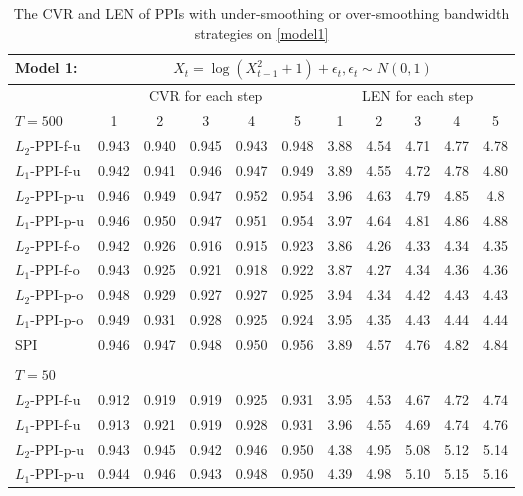 \documentclass[a4paper]{article}
\begin{document}
\begin{table}[htbp]
\centering
  \caption{The CVR and LEN of PPIs with under-smoothing or over-smoothing bandwidth strategies on \cref{model1}}
  \vspace{2pt}
  \label{Tab:model1PPIcompare}
\begin{tabular}{lcccccccccc}
  \toprule 
 Model 1: & \multicolumn{10}{c}{$X_t = \log(X_{t-1}^2 + 1) + \epsilon_t, \epsilon_t\sim N(0,1)$} \\
 \midrule
  & \multicolumn{5}{c}{CVR for each step} & \multicolumn{5}{c}{LEN for each step}\\
    $T = 500$ & 1     & 2     & 3     & 4     & 5 & 1 & 2 & 3 & 4 & 5  \\[3pt]
$L_2$-PPI-f-u & 0.943 & 0.940 & 0.945 & 0.943 & 0.948 & 3.88 & 4.54 & 4.71 & 4.77 & 4.78 \\ 
 $L_1$-PPI-f-u & 0.942 & 0.941 & 0.946 & 0.947 & 0.949 & 3.89 & 4.55 & 4.72 & 4.78 & 4.80\\ 
  $L_2$-PPI-p-u  & 0.946 & 0.949 & 0.947 & 0.952 & 0.954& 3.96 & 4.63 & 4.79 & 4.85 & 4.8  \\ 
 $L_1$-PPI-p-u & 0.946 & 0.950 & 0.947 & 0.951 & 0.954 & 3.97 & 4.64 & 4.81 & 4.86 & 4.88  \\ 
  $L_2$-PPI-f-o & 0.942 & 0.926 & 0.916 & 0.915 & 0.923 & 3.86 & 4.26 & 4.33 & 4.34 & 4.35 \\ 
  $L_1$-PPI-f-o & 0.943 & 0.925 & 0.921 & 0.918 & 0.922 & 3.87 & 4.27 & 4.34 & 4.36 & 4.36 \\ 
  $L_2$-PPI-p-o & 0.948 & 0.929 & 0.927 & 0.927 & 0.925 & 3.94 & 4.34 & 4.42 & 4.43 & 4.43 \\ 
  $L_1$-PPI-p-o & 0.949 & 0.931 & 0.928 & 0.925 & 0.924 & 3.95 & 4.35 & 4.43 & 4.44 & 4.44\\ 
    SPI & 0.946 & 0.947 & 0.948 & 0.950 & 0.956 & 3.89 & 4.57 & 4.76 & 4.82 & 4.84  \\   \\[3pt]
    $T = 50 $       &       &       &       &       &  \\[3pt]
  $L_2$-PPI-f-u & 0.912 & 0.919 & 0.919 & 0.925 & 0.931 & 3.95 & 4.53 & 4.67 & 4.72 & 4.74 \\ 
  $L_1$-PPI-f-u & 0.913 & 0.921 & 0.919 & 0.928 & 0.931 & 3.96 & 4.55 & 4.69 & 4.74 & 4.76 \\ 
  $L_2$-PPI-p-u & 0.943 & 0.945 & 0.942 & 0.946 & 0.950 & 4.38 & 4.95 & 5.08 & 5.12 & 5.14  \\ 
  $L_1$-PPI-p-u & 0.944 & 0.946 & 0.943 & 0.948 & 0.950 & 4.39 & 4.98 & 5.10 & 5.15 & 5.16  \\ 

\end{tabular}
\end{table}
\end{document}
